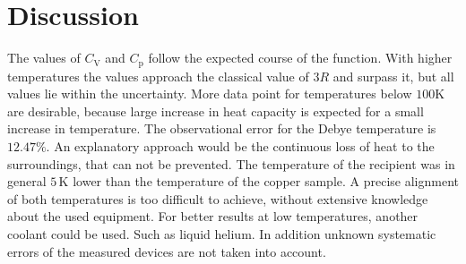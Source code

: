 \section{Discussion}
\label{sec:Diskussion}


The values of $C_\text{V}$ and $C_\text{p} $ follow the expected course of the function. 
With higher temperatures the values approach the classical value of $3R$ and surpass it, 
but all values lie within the uncertainty. 
More data point for temperatures below $100 \unit{\kelvin}$ are desirable, because large increase in heat capacity is expected for a small increase in temperature.
The observational error for the Debye temperature is $12.47 \%$. An explanatory approach would be the continuous loss of heat to the surroundings, that can not be prevented. 
The temperature of the recipient was in general $5 \, \unit{\kelvin}$ lower than the temperature of the copper sample.
A precise alignment of both temperatures is too difficult to achieve, without extensive knowledge about the used equipment.
For better results at low temperatures, another coolant could be used. Such as liquid helium.
In addition unknown systematic errors of the measured devices are not taken into account.